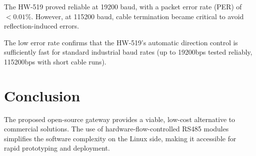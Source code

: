\documentclass[journal]{IEEEtran}
\begin{document}
The HW-519 proved reliable at 19200 baud, with a packet error rate (PER) of $<0.01\%$. However, at 115200 baud, cable termination became critical to avoid reflection-induced errors.

The low error rate confirms that the HW-519's automatic direction control is sufficiently fast for standard industrial baud rates (up to 19200bps tested reliably, 115200bps with short cable runs).

\section{Conclusion}
The proposed open-source gateway provides a viable, low-cost alternative to commercial solutions. The use of hardware-flow-controlled RS485 modules simplifies the software complexity on the Linux side, making it accessible for rapid prototyping and deployment.



\end{document}
